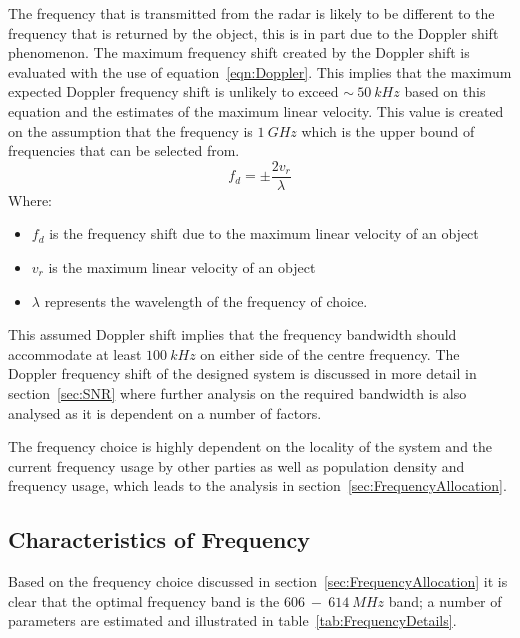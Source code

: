 \documentclass[11pt]{witseiepaper}
\begin{document}
\begin{bibunit}[witseie]
The frequency that is transmitted from the radar is likely to be different to the frequency that is returned by the object, this is in part due to the Doppler shift phenomenon. The maximum frequency shift created by the Doppler shift is evaluated with the use of equation~\ref{eqn:Doppler}. This implies that the maximum expected Doppler frequency shift is unlikely to exceed $\sim~50~kHz$ based on this equation and the estimates of the maximum linear velocity. This value is created on the assumption that the frequency is $1~GHz$ which is the upper bound of frequencies that can be selected from.
\begin{equation} \label{eqn:Doppler}
    f_{d} = \pm \frac{2 v_{r}}{\lambda}    
\end{equation}
Where:
\begin{itemize}
    \item $f_{d}$ is the frequency shift due to the maximum linear velocity of an object
    \item $v_{r}$ is the maximum linear velocity of an object
    \item $\lambda$ represents the wavelength of the frequency of choice.
\end{itemize}
This assumed Doppler shift implies that the frequency bandwidth should accommodate at least $100~kHz$ on either side of the centre frequency.
The Doppler frequency shift of the designed system is discussed in more detail in section~\ref{sec:SNR} where further analysis on the required bandwidth is also analysed as it is dependent on a number of factors.

The frequency choice is highly dependent on the locality of the system and the current frequency usage by other parties as well as population density and frequency usage, which leads to the analysis in section~\ref{sec:FrequencyAllocation}.


\subsection{Characteristics of Frequency} \label{CharacteristicsOfFrequency}
Based on the frequency choice discussed in section~\ref{sec:FrequencyAllocation} it is clear that the optimal frequency band is the $606~-~614~MHz$ band; a number of parameters are estimated and illustrated in table~\ref{tab:FrequencyDetails}.


\end{bibunit}
\end{document}
